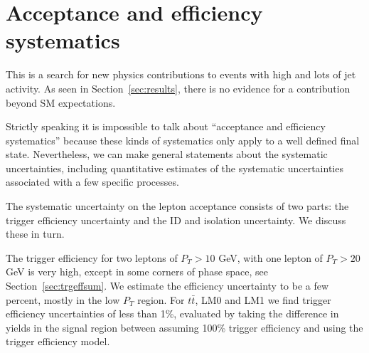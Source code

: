 \section{Acceptance and efficiency systematics}
\label{sec:systematics}

This is a search for new physics contributions to 
events with high \met and lots of jet activity.
As seen in Section~\ref{sec:results}, there is no
evidence for a contribution beyond SM expectations.

Strictly speaking it is impossible to talk about 
``acceptance and efficiency systematics'' because these kinds of
systematics only apply to a well defined final state.
Nevertheless, we can make general statements about the 
systematic uncertainties, including quantitative
estimates of the systematic uncertainties associated with
a few specific processes. 

The systematic uncertainty on the lepton acceptance consists
of two parts: the trigger efficiency uncertainty and the 
ID and isolation uncertainty.  We discuss these in turn.

The trigger efficiency 
for two leptons of $P_T>10$ GeV, with one lepton of 
$P_T>20$ GeV is very high, except in some corners
of phase space, see Section~\ref{sec:trgeffsum}. 
We estimate the efficiency uncertainty to be a few percent,
mostly in the low $P_T$ region. For $t\bar{t}$, LM0 and LM1
we find trigger efficiency uncertainties of less than 1\%, evaluated
by taking the difference in yields in the signal region between
assuming 100\% trigger efficiency and using the trigger efficiency model.

